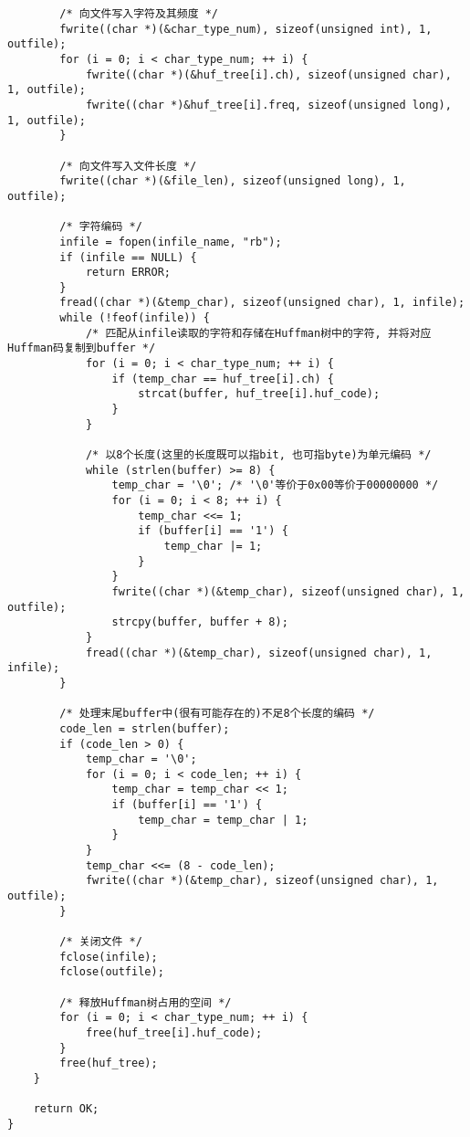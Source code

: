 \documentclass[a4paper]{ctexart}
\begin{document}
{\begin{lstlisting}
        /* 向文件写入字符及其频度 */
        fwrite((char *)(&char_type_num), sizeof(unsigned int), 1, outfile);
        for (i = 0; i < char_type_num; ++ i) {
            fwrite((char *)(&huf_tree[i].ch), sizeof(unsigned char), 1, outfile);
            fwrite((char *)&huf_tree[i].freq, sizeof(unsigned long), 1, outfile);
        }

        /* 向文件写入文件长度 */
        fwrite((char *)(&file_len), sizeof(unsigned long), 1, outfile);

        /* 字符编码 */
        infile = fopen(infile_name, "rb");
        if (infile == NULL) {
            return ERROR;
        }
        fread((char *)(&temp_char), sizeof(unsigned char), 1, infile);
        while (!feof(infile)) {
            /* 匹配从infile读取的字符和存储在Huffman树中的字符, 并将对应Huffman码复制到buffer */
            for (i = 0; i < char_type_num; ++ i) {
                if (temp_char == huf_tree[i].ch) {
                    strcat(buffer, huf_tree[i].huf_code);
                }
            }

            /* 以8个长度(这里的长度既可以指bit, 也可指byte)为单元编码 */
            while (strlen(buffer) >= 8) {
                temp_char = '\0'; /* '\0'等价于0x00等价于00000000 */
                for (i = 0; i < 8; ++ i) {
                    temp_char <<= 1;
                    if (buffer[i] == '1') {
                        temp_char |= 1;
                    }
                }
                fwrite((char *)(&temp_char), sizeof(unsigned char), 1, outfile);
                strcpy(buffer, buffer + 8);
            }
            fread((char *)(&temp_char), sizeof(unsigned char), 1, infile);
        }
        
        /* 处理末尾buffer中(很有可能存在的)不足8个长度的编码 */
        code_len = strlen(buffer);
        if (code_len > 0) {
            temp_char = '\0';
            for (i = 0; i < code_len; ++ i) {
                temp_char = temp_char << 1;
                if (buffer[i] == '1') {
                    temp_char = temp_char | 1;
                }
            }
            temp_char <<= (8 - code_len);
            fwrite((char *)(&temp_char), sizeof(unsigned char), 1, outfile);
        }

        /* 关闭文件 */
        fclose(infile);
        fclose(outfile);

        /* 释放Huffman树占用的空间 */
        for (i = 0; i < char_type_num; ++ i) {
            free(huf_tree[i].huf_code);
        }
        free(huf_tree);
    }

    return OK;
}
\end{lstlisting}}
\end{document}
